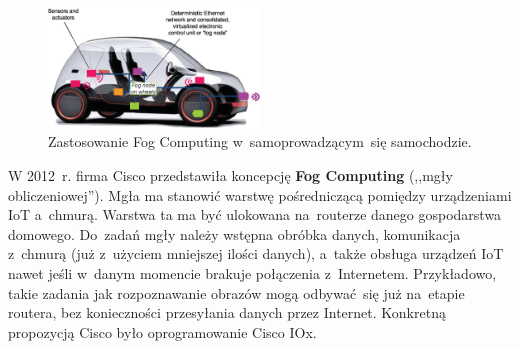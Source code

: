 \documentclass[12pt,a4paper,twoside,titlepage,openright]{book}
\begin{document}
\begin{figure}[h]
	\centering
			\includegraphics[width=0.5\textwidth]{fog-samochod.png}
		\caption{Zastosowanie Fog Computing w~samoprowadzącym~się samochodzie. \cite{fog5g}}
		\label{fig:fog-samochod}
\end{figure}

W 2012~r. firma Cisco przedstawiła koncepcję \textbf{Fog Computing} (,,mgły obliczeniowej''). Mgła ma stanowić warstwę pośredniczącą pomiędzy urządzeniami IoT a~chmurą. Warstwa ta ma być ulokowana na~routerze danego gospodarstwa domowego. Do~zadań mgły należy wstępna obróbka danych, komunikacja z~chmurą (już z~użyciem mniejszej ilości danych), a~także obsługa urządzeń IoT nawet jeśli w~danym momencie brakuje połączenia z~Internetem. Przykładowo, takie zadania jak rozpoznawanie obrazów mogą odbywać~się już na~etapie routera, bez konieczności przesyłania danych przez Internet. Konkretną propozycją Cisco było oprogramowanie Cisco IOx. \cite{fogArticle, iotArchitects}
\end{document}
